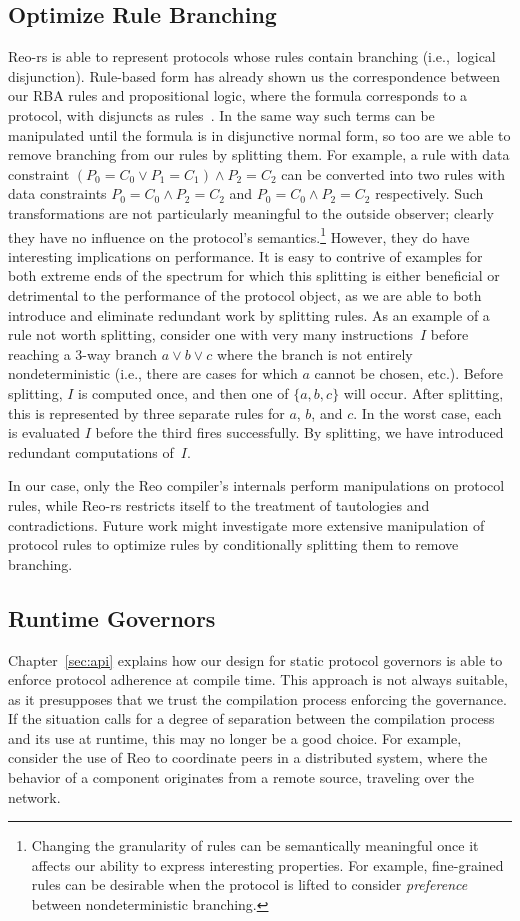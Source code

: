 \subsection{Optimize Rule Branching}
\label{sec:future_branches}
Reo-rs is able to represent protocols whose rules contain branching (i.e.,\ logical disjunction). Rule-based form has already shown us the correspondence between our RBA rules and propositional logic, where the formula corresponds to a protocol, with disjuncts as rules~\cite{dokter2018rule}. In the same way such terms can be manipulated until the formula is in disjunctive normal form, so too are we able to remove branching from our rules by splitting them. For example, a rule with data constraint $(P_0=C_0\vee{}P_1=C_1)\wedge{}P_2=C_2$ can be converted into two rules with data constraints $P_0=C_0\wedge{}P_2=C_2$ and $P_0=C_0\wedge{}P_2=C_2$ respectively. Such transformations are not particularly meaningful to the outside observer; clearly they have  no influence on the protocol's semantics.\footnote{Changing the granularity of rules can be semantically meaningful once it affects our ability to express interesting properties. For example, fine-grained rules can be desirable when the protocol is lifted to consider \textit{preference} between nondeterministic branching.} However, they do have interesting implications on performance. It is easy to contrive of examples for both extreme ends of the spectrum for which this splitting is either beneficial or detrimental to the performance of the protocol object, as we are able to both introduce and eliminate redundant work by splitting rules. As an example of a rule not worth splitting, consider one with very many instructions~$I$ before reaching a 3-way branch $a\vee{}b\vee{}c$ where the branch is not entirely nondeterministic (i.e., there are cases for which $a$ cannot be chosen, etc.). Before splitting, $I$ is computed once, and then one of $\{a,b,c\}$ will occur. After splitting, this is represented by three separate rules for $a$, $b$, and $c$. In the worst case, each is evaluated $I$ before the third fires successfully. By splitting, we have introduced redundant computations of~$I$.

In our case, only the Reo compiler's internals perform manipulations on protocol rules, while Reo-rs restricts itself to the treatment of tautologies and contradictions. Future work might investigate more extensive manipulation of protocol rules to optimize rules by conditionally splitting them to remove branching.

\subsection{Runtime Governors}
Chapter~\ref{sec:api} explains how our design for static protocol governors is able to enforce protocol adherence at compile time. This approach is not always suitable, as it presupposes that we trust the compilation process enforcing the governance. If the situation calls for a degree of separation between the compilation process and its use at runtime, this may no longer be a good choice. For example, consider the use of Reo to coordinate peers in a distributed system, where the behavior of a component originates from a remote source, traveling over the network.

